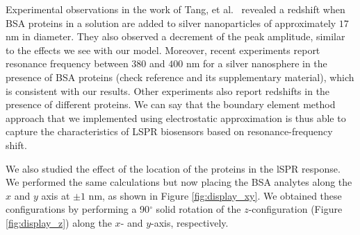 Experimental observations in the work of Tang, et al.~\cite{TangETal2010} revealed a redshift when 
BSA proteins in a solution are added to silver nanoparticles of approximately $17$ nm 
in diameter. They also observed a decrement of the peak amplitude, similar to the 
effects we see with our model. Moreover, recent experiments \cite{PuETal2018} report 
resonance frequency between $380$ and $400$ nm for a silver nanosphere in the presence
of BSA proteins (check reference and its supplementary material), which is consistent with 
our results. Other experiments \cite{RaphaelETal2013} also report redshifts in the presence
of different proteins. We can say that the boundary element method approach that we implemented using 
electrostatic approximation is thus able to capture the characteristics of LSPR biosensors
based on resonance-frequency shift. 

We also studied the effect of the location of the proteins in the lSPR response. We performed 
the same calculations but now placing the BSA analytes along the $x$ and $y$ axis at $\pm 1$ nm,
as shown in Figure \ref{fig:display_xy}. We obtained these configurations by performing
a 90$^\circ$ solid rotation of the $z$-configuration (Figure \ref{fig:display_z}) along the $x$- and $y$-axis, respectively. 

